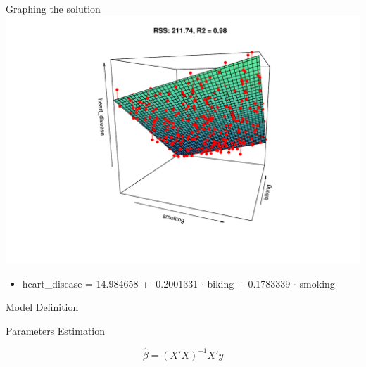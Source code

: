 \documentclass[
  ignorenonframetext,
]{beamer}
\providecommand{\tightlist}{%
  \setlength{\itemsep}{0pt}\setlength{\parskip}{0pt}}\usepackage{longtable,booktabs,array}
\begin{document}
\begin{frame}{Graphing the solution}
\protect\hypertarget{graphing-the-solution}{}
\includegraphics{2_1_files/figure-beamer/unnamed-chunk-4-1.pdf}

\begin{itemize}
\tightlist
\item
  heart\_disease = 14.984658 + -0.2001331 \(\cdot\) biking + 0.1783339
  \(\cdot\) smoking
\end{itemize}
\end{frame}

\begin{frame}{Model Definition}
\protect\hypertarget{model-definition}{}
\end{frame}

\begin{frame}{}
\protect\hypertarget{section-1}{}
\begin{center}
\Huge Parameters Estimation
\end{center}
\end{frame}

\begin{frame}{}
\protect\hypertarget{section-2}{}
\[
\hat{\beta} = (X'X)^{-1}X'y
\]
\end{frame}
\end{document}
